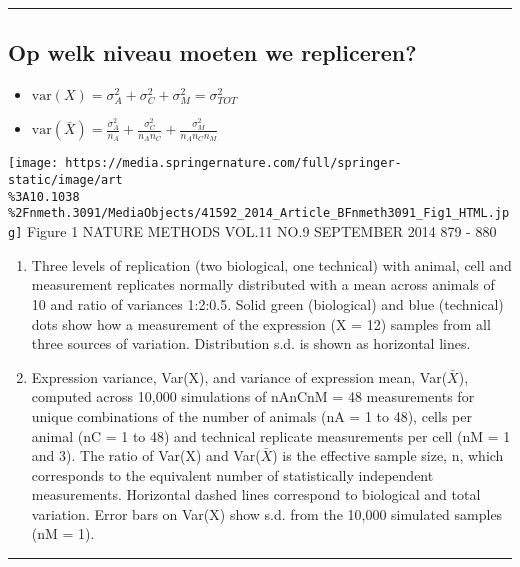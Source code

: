 \documentclass[
]{article}
\providecommand{\tightlist}{%
  \setlength{\itemsep}{0pt}\setlength{\parskip}{0pt}}
\begin{document}
\begin{center}\rule{0.5\linewidth}{0.5pt}\end{center}

\hypertarget{op-welk-niveau-moeten-we-repliceren}{%
\subsection{Op welk niveau moeten we
repliceren?}\label{op-welk-niveau-moeten-we-repliceren}}

\begin{itemize}
\tightlist
\item
  \(\text{var}(X)=\sigma^2_A+\sigma^2_C+\sigma^2_M=\sigma^2_{TOT}\)
\item
  \(\text{var}(\bar{X})=\frac{\sigma^2_A}{n_A}+\frac{\sigma^2_C}{n_A n_C} + \frac{\sigma^2_M}{n_A n_C n_M}\)
\end{itemize}

\texttt{[image: https://media.springernature.com/full/springer-static/image/art\\\%3A10.1038\\\%2Fnmeth.3091/MediaObjects/41592\_2014\_Article\_BFnmeth3091\_Fig1\_HTML.jpg]}
Figure 1 NATURE METHODS \textbar{} VOL.11 NO.9 \textbar{} SEPTEMBER 2014
\textbar{} 879 - 880

\begin{enumerate}
\def\labelenumi{(\alph{enumi})}
\tightlist
\item
  Three levels of replication (two biological, one technical) with
  animal, cell and measurement replicates normally distributed with a
  mean across animals of 10 and ratio of variances 1:2:0.5. Solid green
  (biological) and blue (technical) dots show how a measurement of the
  expression (X = 12) samples from all three sources of variation.
  Distribution s.d. is shown as horizontal lines.
\item
  Expression variance, Var(X), and variance of expression mean,
  Var(\(\bar X\)), computed across 10,000 simulations of nAnCnM = 48
  measurements for unique combinations of the number of animals (nA = 1
  to 48), cells per animal (nC = 1 to 48) and technical replicate
  measurements per cell (nM = 1 and 3). The ratio of Var(X) and
  Var(\(\bar X\)) is the effective sample size, n, which corresponds to
  the equivalent number of statistically independent measurements.
  Horizontal dashed lines correspond to biological and total variation.
  Error bars on Var(X) show s.d. from the 10,000 simulated samples (nM =
  1).
\end{enumerate}

\begin{center}\rule{0.5\linewidth}{0.5pt}\end{center}
\end{document}
